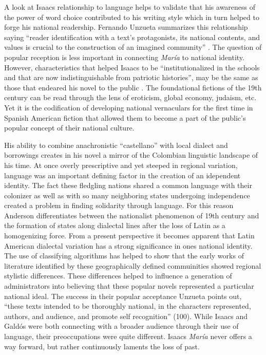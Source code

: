\documentclass[12pt]{report}
\begin{document}
A look at Isaacs relationship to language helps to validate that his awareness of the power of word choice contributed to his writing style which in turn helped to forge his national readership.
Fernando Unzueta summarizes this relationship saying \enquote{reader identification with a text's protagonists, its national contents, and values is crucial to the construction of an imagined community} \autocite[82]{Unzueta2002}.
The question of popular reception is less important in connecting \textit{María} to national identity.
However, characteristics that helped Isaacs to be \enquote{institutionalized in the schools and that are now indistinguishable from patriotic histories}, may be the same as those that endeared his novel to the public \autocite[add. text]{Sommer1991}.
The foundational fictions of the 19th century can be read through the lens of eroticism, global economy, judaism, etc.
Yet it is the codification of developing national vernaculars for the first time in Spanish American fiction that allowed them to become a part of the public's popular concept of their national culture. 


His ability to combine anachronistic \enquote{castellano} with local dialect and borrowings creates in his novel a mirror of the Colombian linguistic landscape of his time.
At once overly prescriptive and yet steeped in regional variation, language was an important defining factor in the creation of an idependent identity.
The fact these fledgling nations shared a common language with their colonizer as well as with so many neighboring states undergoing independence created a problem in finding solidarity through language.
For this reason Anderson differentiates between the nationalist phenomenon of 19th century and the formation of states along dialectal lines after the loss of Latin as a homogenizing force. 
From a present perspective it becomes apparent that Latin American dialectal variation has a strong significance in ones national identity.
The use of classifying algorithms has helped to show that the early works of literature identified by these geographically defined commuinities showed regional stylistic differences. 
These differences helped to influence a generation of administrators into believing that these popular novels represented a particular national ideal.
The success in their popular acceptance Unzueta points out, \enquote{these texts intended to be thoroughly national, in the characters represented, authors, and audience, and promote self recognition} (100). 
While Isaacs and Galdós were both connecting with a broader audience through their use of language, their preoccupations were quite different.
Isaacs \textit{María} never offers a way forward, but rather continuously laments the loss of past.
\end{document}
